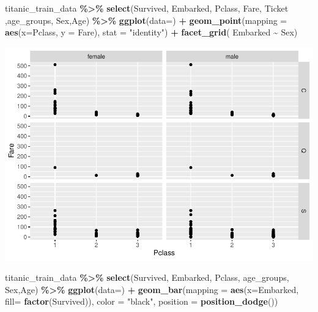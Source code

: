 \documentclass[
]{article}
\newenvironment{Shaded}{\begin{snugshade}}{\end{snugshade}}
\newcommand{\AttributeTok}[1]{\textcolor[rgb]{0.13,0.29,0.53}{#1}}
\newcommand{\FunctionTok}[1]{\textcolor[rgb]{0.13,0.29,0.53}{\textbf{#1}}}
\newcommand{\NormalTok}[1]{#1}
\newcommand{\SpecialCharTok}[1]{\textcolor[rgb]{0.81,0.36,0.00}{\textbf{#1}}}
\newcommand{\StringTok}[1]{\textcolor[rgb]{0.31,0.60,0.02}{#1}}
\begin{document}
\begin{Shaded}
\begin{Highlighting}[]
\NormalTok{titanic\_train\_data }\SpecialCharTok{\%\textgreater{}\%}
  \FunctionTok{select}\NormalTok{(Survived, Embarked, Pclass, Fare, Ticket ,age\_groups, Sex,Age) }\SpecialCharTok{\%\textgreater{}\%}
  \FunctionTok{ggplot}\NormalTok{(}\AttributeTok{data=}\NormalTok{) }\SpecialCharTok{+} 
  \FunctionTok{geom\_point}\NormalTok{(}\AttributeTok{mapping =}  \FunctionTok{aes}\NormalTok{(}\AttributeTok{x=}\NormalTok{Pclass, }\AttributeTok{y =}\NormalTok{ Fare), }\AttributeTok{stat =} \StringTok{"identity"}\NormalTok{) }\SpecialCharTok{+}
  \FunctionTok{facet\_grid}\NormalTok{( Embarked }\SpecialCharTok{\textasciitilde{}}\NormalTok{ Sex)}
\end{Highlighting}
\end{Shaded}

\includegraphics{Titanic-Documentation_files/figure-latex/unnamed-chunk-28-1.pdf}

\begin{Shaded}
\begin{Highlighting}[]
\NormalTok{titanic\_train\_data }\SpecialCharTok{\%\textgreater{}\%}
  \FunctionTok{select}\NormalTok{(Survived, Embarked, Pclass, age\_groups, Sex,Age) }\SpecialCharTok{\%\textgreater{}\%}
  \FunctionTok{ggplot}\NormalTok{(}\AttributeTok{data=}\NormalTok{) }\SpecialCharTok{+} 
  \FunctionTok{geom\_bar}\NormalTok{(}\AttributeTok{mapping =}  \FunctionTok{aes}\NormalTok{(}\AttributeTok{x=}\NormalTok{Embarked, }\AttributeTok{fill=} \FunctionTok{factor}\NormalTok{(Survived)), }\AttributeTok{color =} \StringTok{"black"}\NormalTok{, }\AttributeTok{position =} \FunctionTok{position\_dodge}\NormalTok{())}
\end{Highlighting}
\end{Shaded}
\end{document}
